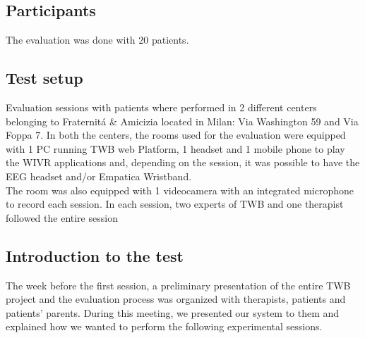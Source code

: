 \subsection{Participants}
The evaluation was done with 20 patients.
\subsection{Test setup}
Evaluation sessions with patients where performed in 2 different centers belonging to Fraternit\'a \& Amicizia located in Milan: Via Washington 59 and Via Foppa 7. In both the centers, the rooms used for the evaluation were equipped with 1 PC running TWB web Platform, 1 headset and 1 mobile phone to play the WIVR applications and, depending on the session, it was possible to have the EEG headset and/or Empatica Wristband. \\
The room was also equipped with 1 videocamera with an integrated microphone to record each session. 
In each session, two experts of TWB and one therapist followed the entire session
\subsection{Introduction to the test}
The week before the first session, a preliminary presentation of the entire TWB project and the evaluation process was organized with therapists, patients and patients' parents. During this meeting, we presented our system to them and explained how we wanted to perform the following experimental sessions.
